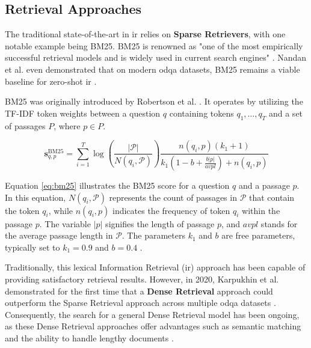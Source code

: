 
\subsection{Retrieval Approaches}
\label{subsec:qa_retrieval}

The traditional state-of-the-art in \gls{ir} relies on \textbf{Sparse Retrievers}, with one notable example being BM25. BM25 is renowned as "one of the most empirically successful retrieval models and is widely used in current search engines" \cite{zhu_retrieving_2021}. Nandan et al. even demonstrated that on modern \gls{odqa} datasets, BM25 remains a viable baseline for zero-shot \gls{ir} \cite{thakur_beir_2021}.

BM25 was originally introduced by Robertson et al. \cite{robertson_probabilistic_2009}. It operates by utilizing the TF-IDF token weights between a question $q$ containing tokens $q_1, \ldots, q_T$ and a set of passages $P$, where $p \in P$.

\begin{equation}
    \mathbf{s}_{q, p}^{\text{BM25}}=\sum_{i=1}^T \log \left(\frac{|\mathcal{P}|}{N\left(q_i, \mathcal{P}\right)}\right) \frac{n\left(q_i, p\right)\left(k_1+1\right)}{k_1\left(1-b+\frac{b|p|}{a v p l}\right)+n\left(q_i, p\right)}
    \label{eq:bm25}
\end{equation}

    
Equation \ref{eq:bm25} illustrates the BM25 score for a question $q$ and a passage $p$. In this equation, $N\left(q_i, \mathcal{P}\right)$ represents the count of passages in $\mathcal{P}$ that contain the token $q_i$, while $n\left(q_i, p\right)$ indicates the frequency of token $q_i$ within the passage $p$. The variable $|p|$ signifies the length of passage $p$, and $avpl$ stands for the average passage length in $\mathcal{P}$. The parameters $k_1$ and $b$ are free parameters, typically set to $k_1 = 0.9$ and $b = 0.4$ \cite{mcdonald_detect_2022,robertson_probabilistic_2009}.

Traditionally, this lexical Information Retrieval (\gls{ir}) approach has been capable of providing satisfactory retrieval results. However, in 2020, Karpukhin et al. demonstrated for the first time that a \textbf{Dense Retrieval} approach could outperform the Sparse Retrieval approach across multiple \gls{odqa} datasets \cite{karpukhin_dense_2020}. Consequently, the search for a general Dense Retrieval model has been ongoing, as these Dense Retrieval approaches offer advantages such as semantic matching and the ability to handle lengthy documents \cite{zhu_retrieving_2021}.

